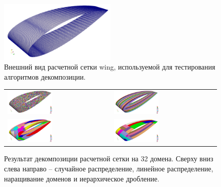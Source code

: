 \begin{figure}[ht]
\centering
\includegraphics[width=0.5\textwidth]{./pics/text_2_decompsurf/wing_grid.png}
\singlespacing
{}\caption{Внешний вид расчетной сетки wing, используемой для тестирования алгоритмов декомпозиции.}
\label{fig:text_2_decompsurf_wing_grid}
\end{figure}

\begin{figure}[ht]
\centering
\begin{tabular}{ll}
\includegraphics[width=0.45\textwidth]{./pics/text_2_decompsurf/wing_random_32.png}
&
\includegraphics[width=0.45\textwidth]{./pics/text_2_decompsurf/wing_linear_32.png}
\\
\includegraphics[width=0.45\textwidth]{./pics/text_2_decompsurf/wing_rgrow_32.png}
&
\includegraphics[width=0.45\textwidth]{./pics/text_2_decompsurf/wing_hierarchical_32.png}
\end{tabular}
\singlespacing
{}\caption{Результат декомпозиции расчетной сетки на 32 домена. Сверху вниз слева направо -- случайное распределение, линейное распределение, наращивание доменов и иерархическое дробление\label{term:alg_decomp_hierarch}.}
\label{fig:text_2_decompsurf_4}
\end{figure}

